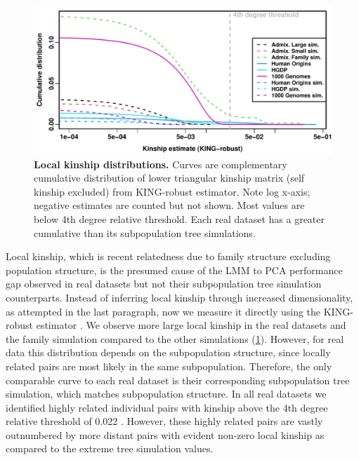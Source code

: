 \documentclass[11pt]{article}
\begin{document}
\begin{linenumbers}
\begin{figure}[b!]
  \centering
  \includegraphics[width=\textwidth]{king_log-x.pdf}
  \caption{
    {\bf Local kinship distributions.}
    Curves are complementary cumulative distribution of lower triangular kinship matrix (self kinship excluded) from KING-robust estimator.
    Note log x-axis; negative estimates are counted but not shown.
    Most values are below 4th degree relative threshold.
    Each real dataset has a greater cumulative than its subpopulation tree simulations.
  }
  \label{fig:king}
\end{figure}

Local kinship, which is recent relatedness due to family structure excluding population structure, is the presumed cause of the LMM to PCA performance gap observed in real datasets but not their subpopulation tree simulation counterparts.
Instead of inferring local kinship through increased dimensionality, as attempted in the last paragraph, now we measure it directly using the KING-robust estimator \citep{manichaikul_robust_2010}.
We observe more large local kinship in the real datasets and the family simulation compared to the other simulations (\cref{fig:king}).
However, for real data this distribution depends on the subpopulation structure, since locally related pairs are most likely in the same subpopulation.
Therefore, the only comparable curve to each real dataset is their corresponding subpopulation tree simulation, which matches subpopulation structure.
In all real datasets we identified highly related individual pairs with kinship above the 4th degree relative threshold of 0.022 \citep{manichaikul_robust_2010, conomos_model-free_2016}.
However, these highly related pairs are vastly outnumbered by more distant pairs with evident non-zero local kinship as compared to the extreme tree simulation values.


\end{linenumbers}
\end{document}
